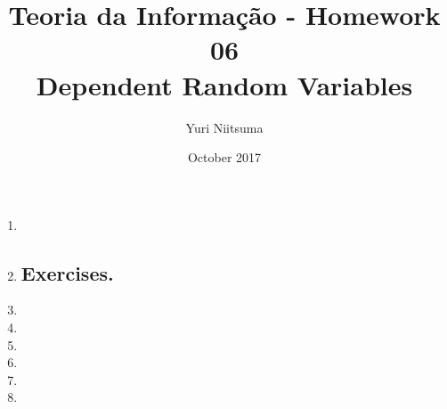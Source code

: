 \documentclass[onecolumn]{IEEEtran}
\title{Teoria da Informação - Homework 06 \\ Dependent Random Variables}
\author{Yuri Niitsuma}
\date{October 2017}
\begin{document}
\maketitle

\begin{enumerate}
\itemsep1em

    \section*{Review questions.}
	
	\item
	
	\bigskip
	\newpage
	\item
	
    \bigskip
    
    \subsection*{Exercises.}
    \item
    
    \bigskip
    \newpage
    \item
    
    \bigskip
    \item
    
    \bigskip
    \item
    
    \bigskip
    \item
    
    \bigskip
    \item
    
    \bigskip

\end{enumerate}
\end{document}
